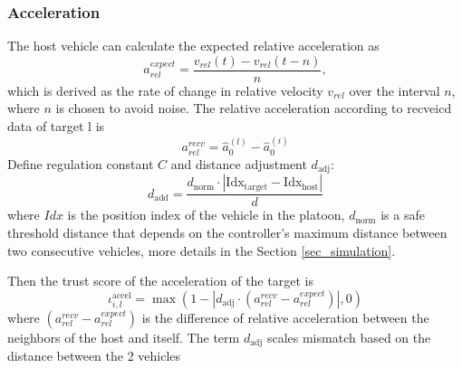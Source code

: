 \documentclass[letterpaper, 10pt, conference]{ieeeconf}  %
\begin{document}
\subsubsection{Acceleration}
The host vehicle can calculate the expected relative acceleration as 
\begin{equation}
    a_{rel}^{expect} = \dfrac{v_{rel}(t) - v_{rel}(t-n) }{n},
\end{equation}
 which is derived as the rate of change in relative velocity $v_{rel}$ over the interval $n$, where $ n$ is chosen to avoid noise.
The relative acceleration according to recveicd data of target l is 
\begin{equation}
a_{rel}^{recv} = \hat{a}_0^{(l)} - \hat{a}_0^{(i)}
\end{equation}
Define regulation constant $C$ and distance adjustment $d_{\text{adj}}$:
\begin{equation}
d_{\text{add}} = \frac{d_{\text{norm}} \cdot |\text{Idx}_{\text{target}} - \text{Idx}_{\text{host}}|}{d}    
\end{equation}
where $Idx$ is the position index of the vehicle in the platoon, $d_{\text{norm}}$ is a safe threshold distance that depends on the controller's maximum distance between two consecutive vehicles, more details in the Section \ref{sec_simulation}. 



Then the trust score of the acceleration of the target is 
\begin{equation}
   \iota_{i,l}^{\text{accel}} = \max\left(1 - \left| d_{\text{adj}} \cdot \left(a_{rel}^{recv} - a_{rel}^{expect}  \right) \right|, 0\right)
\end{equation}
where $\left(a_{rel}^{recv} - a_{rel}^{expect}  \right)$ is the difference of relative acceleration between the neighbors of the host and itself.  
The term $d_{\text{adj}}$ scales mismatch based on the distance between the 2 vehicles 
\end{document}
